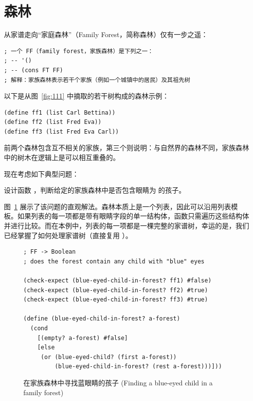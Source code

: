 \section{森林 }
\label{sec:19.2_forests}

从家谱走向“家庭森林”（Family Forest，简称森林）仅有一步之遥：

\begin{lstlisting}[language=BSL]
; 一个 FF（family forest，家族森林）是下列之一：
; -- '()
; -- (cons FT FF)
; 解释：家族森林表示若干个家族（例如一个城镇中的居民）及其祖先树
\end{lstlisting}

以下是从图~\ref{fig:111} 中摘取的若干树构成的森林示例：

\begin{lstlisting}[language=BSL]
(define ff1 (list Carl Bettina))
(define ff2 (list Fred Eva))
(define ff3 (list Fred Eva Carl))
\end{lstlisting}

前两个森林包含互不相关的家族，第三个则说明：与自然界的森林不同，家族森林中的树木在逻辑上是可以相互重叠的。

现在考虑如下典型问题：

\begin{notebox}[样本问题]
设计函数 ，判断给定的家族森林中是否包含眼睛为  的孩子。
\end{notebox}

图~\ref{fig:115} 展示了该问题的直观解法。森林本质上是一个列表，因此可以沿用列表模板。如果列表的每一项都是带有眼睛字段的单一结构体，函数只需遍历这些结构体并进行比较。而在本例中，列表的每一项都是一棵完整的家谱树，幸运的是，我们已经掌握了如何处理家谱树（直接复用 ）。

\begin{figure}[htbp]
  \centering
\begin{lstlisting}[language=BSL, basicstyle=\scriptsize\ttfamily]
; FF -> Boolean
; does the forest contain any child with "blue" eyes

(check-expect (blue-eyed-child-in-forest? ff1) #false)
(check-expect (blue-eyed-child-in-forest? ff2) #true)
(check-expect (blue-eyed-child-in-forest? ff3) #true)

(define (blue-eyed-child-in-forest? a-forest)
  (cond
    [(empty? a-forest) #false]
    [else
     (or (blue-eyed-child? (first a-forest))
         (blue-eyed-child-in-forest? (rest a-forest)))]))
\end{lstlisting}
  \caption{在家族森林中寻找蓝眼睛的孩子 (Finding a blue-eyed child in a family forest)}
  \label{fig:115}
\end{figure}

